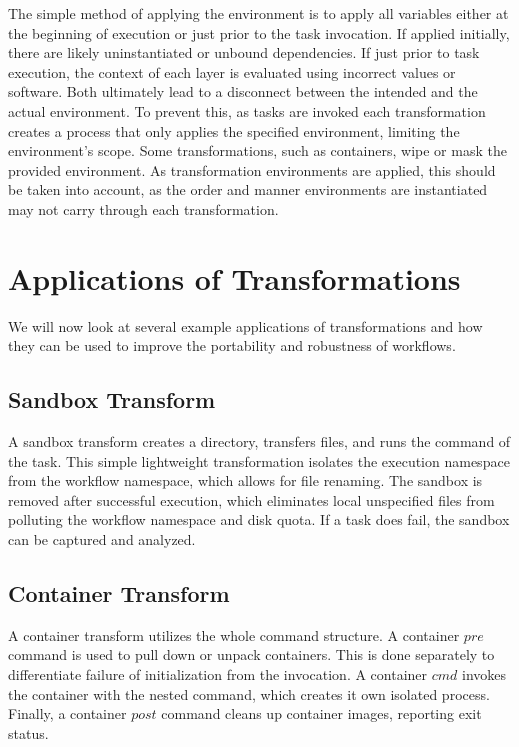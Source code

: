 \documentclass[conference]{IEEEtran}
\begin{document}
The simple method of applying the environment is to 
apply all variables either 
at the beginning of execution or 
just prior to the task invocation. 
If applied initially, there are likely uninstantiated
or unbound dependencies. 
If just prior to task execution, the context 
of each layer is evaluated using incorrect values or software.
Both ultimately lead to a disconnect 
between the intended and the actual environment.
To prevent this, as tasks are invoked 
each transformation creates a process
that only applies the specified environment,
limiting the environment's scope.
Some transformations, such as containers, 
wipe or mask the provided environment.
As transformation environments are applied, 
this should be taken into account, 
as the order and manner environments are instantiated 
may not carry through each transformation.


\section{Applications of Transformations}

We will now look at several example applications of
transformations and how they can be used to improve the portability and robustness of workflows.

\subsection{Sandbox Transform}

A sandbox transform creates a directory,
transfers files, and runs the command 
of the task.
This simple lightweight transformation isolates
the execution namespace from the workflow namespace,
which allows for file renaming.
The sandbox is removed after successful execution,
which eliminates local unspecified files from
polluting the workflow namespace and disk quota.
If a task does fail, the sandbox can be captured
and analyzed.

\subsection{Container Transform}

A container transform utilizes the whole
command structure.
A container $pre$ command is used to pull down
or unpack containers.
This is done separately to 
differentiate failure of initialization
from the invocation.
A container $cmd$ invokes the container with the 
nested command, which creates it own isolated process.
Finally, a container $post$ command cleans
up container images, reporting exit status.
\end{document}
